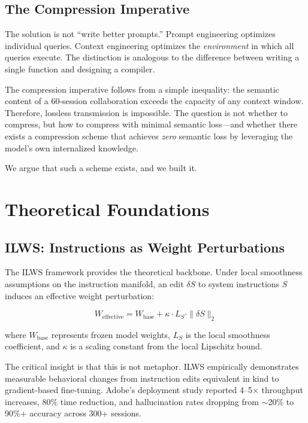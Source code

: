 \documentclass[11pt, a4paper]{article}
\begin{document}
\subsection{The Compression Imperative}

The solution is not ``write better prompts.'' Prompt engineering optimizes individual queries. Context engineering optimizes the \emph{environment} in which all queries execute. The distinction is analogous to the difference between writing a single function and designing a compiler.

The compression imperative follows from a simple inequality: the semantic content of a 60-session collaboration exceeds the capacity of any context window. Therefore, lossless transmission is impossible. The question is not whether to compress, but how to compress with minimal semantic loss---and whether there exists a compression scheme that achieves \emph{zero} semantic loss by leveraging the model's own internalized knowledge.

We argue that such a scheme exists, and we built it.

\section{Theoretical Foundations}
\label{sec:theory}

\subsection{ILWS: Instructions as Weight Perturbations}

The ILWS framework \citep{ilws2025} provides the theoretical backbone. Under local smoothness assumptions on the instruction manifold, an edit $\delta S$ to system instructions $S$ induces an effective weight perturbation:

\begin{equation}
    W_{\text{effective}} = W_{\text{base}} + \kappa \cdot L_S \cdot \|\delta S\|_2
    \label{eq:ilws}
\end{equation}

\noindent where $W_{\text{base}}$ represents frozen model weights, $L_S$ is the local smoothness coefficient, and $\kappa$ is a scaling constant from the local Lipschitz bound.

The critical insight is that this is not metaphor. ILWS empirically demonstrates measurable behavioral changes from instruction edits equivalent in kind to gradient-based fine-tuning. Adobe's deployment study reported 4--5$\times$ throughput increases, 80\% time reduction, and hallucination rates dropping from $\sim$20\% to 90\%+ accuracy across 300+ sessions.
\end{document}
